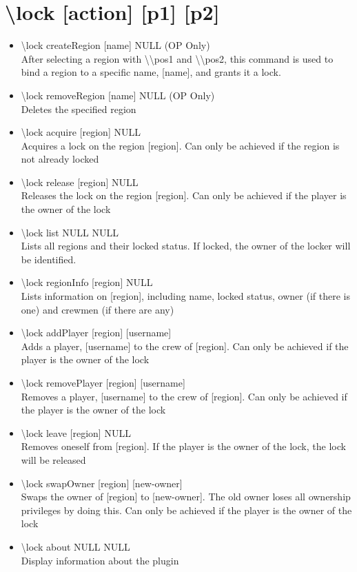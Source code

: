 \documentclass[a4paper,twoside,notitlepage,11pt]{article}
\begin{document}
\section{\textbackslash lock [action] [p1] [p2]}
\begin{itemize}
\item \textbackslash lock createRegion [name] NULL (OP Only)\\
After selecting a region with \textbackslash\textbackslash pos1 and \textbackslash\textbackslash pos2, this command is used to bind a region to a specific name, [name], and grants it a lock.
\item \textbackslash lock removeRegion [name] NULL (OP Only)\\
Deletes the specified region
\item \textbackslash lock acquire [region] NULL\\
Acquires a lock on the region [region]. Can only be achieved if the region is not already locked
\item \textbackslash lock release [region] NULL\\
Releases the lock on the region [region]. Can only be achieved if the player is the owner of the lock
\item \textbackslash lock list NULL NULL\\
Lists all regions and their locked status. If locked, the owner of the locker will be identified.
\item \textbackslash lock regionInfo [region] NULL\\
Lists information on [region], including name, locked status, owner (if there is one) and crewmen (if there are any)
\item \textbackslash lock addPlayer [region] [username]\\
Adds a player, [username] to the crew of [region]. Can only be achieved if the player is the owner of the lock
\item \textbackslash lock removePlayer [region] [username]\\
Removes a player, [username] to the crew of [region]. Can only be achieved if the player is the owner of the lock
\item \textbackslash lock leave [region] NULL\\
Removes oneself from [region]. If the player is the owner of the lock, the lock will be released
\item \textbackslash lock swapOwner [region] [new-owner]\\
Swaps the owner of [region] to [new-owner]. The old owner loses all ownership privileges by doing this. Can only be achieved if the player is the owner of the lock
\item \textbackslash lock about NULL NULL \\
Display information about the plugin
\end{itemize}
\end{document}
